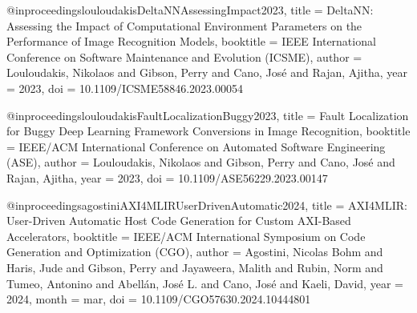 @inproceedings{louloudakisDeltaNNAssessingImpact2023,
  title = {{{DeltaNN}}: {{Assessing}} the {{Impact}} of {{Computational Environment Parameters}} on the {{Performance}} of {{Image Recognition Models}}},
  booktitle = {{{IEEE International Conference}} on {{Software Maintenance}} and {{Evolution}} ({{ICSME}})},
  author = {Louloudakis, Nikolaos and Gibson, Perry and Cano, Jos{\'e} and Rajan, Ajitha},
  year = {2023},
  doi = {10.1109/ICSME58846.2023.00054}
}

@inproceedings{louloudakisFaultLocalizationBuggy2023,
  title = {Fault {{Localization}} for {{Buggy Deep Learning Framework Conversions}} in {{Image Recognition}}},
  booktitle = {{{IEEE}}/{{ACM International Conference}} on {{Automated Software Engineering}} ({{ASE}})},
  author = {Louloudakis, Nikolaos and Gibson, Perry and Cano, Jos{\'e} and Rajan, Ajitha},
  year = {2023},
  doi = {10.1109/ASE56229.2023.00147}
}

@inproceedings{agostiniAXI4MLIRUserDrivenAutomatic2024,
  title = {{{AXI4MLIR}}: {{User-Driven Automatic Host Code Generation}} for {{Custom AXI-Based Accelerators}}},
  booktitle = {{{IEEE}}/{{ACM International Symposium}} on {{Code Generation}} and {{Optimization}} ({{CGO}})},
  author = {Agostini, Nicolas Bohm and Haris, Jude and Gibson, Perry and Jayaweera, Malith and Rubin, Norm and Tumeo, Antonino and Abell{\'a}n, Jos{\'e} L. and Cano, Jos{\'e} and Kaeli, David},
  year = {2024},
  month = mar,
  doi = {10.1109/CGO57630.2024.10444801}
}
